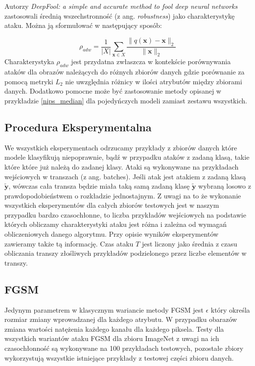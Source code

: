 \documentclass[
    left=2.5cm,         %
    right=2.5cm,        %
    top=2.5cm,          %
    bottom=3cm,         %
    bindingoffset=6mm,  %
    nohyphenation=false %
]{eiti/eiti-thesis}
\renewcommand{\vec}[1]{\mathbf{#1}}
\begin{document}
    Autorzy \textit{DeepFool: a simple and accurate method to fool deep neural networks}\cite{DBLP:journals/corr/Moosavi-Dezfooli15}
    zastosowali średnią wszechstronność (z ang. \textit{robustness}) jako charakterystykę ataku. Można ją sformułować w następujący sposób:

    \begin{equation}
        \rho_{adw}=\frac{1}{|X|}\sum_{\vec{x} \in X} \frac{\|q(\vec{x}) - \vec{x}\|_2}{\|\vec{x}\|_2}
    \end{equation}
    Charakterystyka \(\rho_{adw}\) jest przydatna zwłaszcza w kontekście porównywania ataków dla obrazów należących do
    różnych zbiorów danych gdzie porównanie za pomocą metryki \(L_2\) nie uwzględnia różnicy w ilości atrybutów między zbiorami
    danych.
    Dodatkowo pomocne może być zastosowanie metody opisanej w przykładzie \eqref{nips_median} dla pojedyńczych modeli
    zamiast zestawu wszystkich.

\subsection{Procedura Eksperymentalna}
    We wszystkich eksperymentach odrzucamy przykłady z zbiorów danych które modele klasyfikują niepoprawnie, bądź w
    przypadku ataków z zadaną klasą, takie które które już należą do zadanej klasy. Ataki są wykonywane na przykładach
    wejściowych w transzach (z ang. batches).
Jeśli atak jest atakiem z zadaną klasą $\vec{\widetilde{y}}$, wówczas
    cała transza będzie miała taką samą zadaną klasę $\vec{\widetilde{y}}$ wybraną losowo z prawdopodobieństwem o
    rozkładzie jednostajnym.
Z uwagi na to że wykonanie wszystkich eksperymentów dla całych zbiorów testowych jest w naszym przypadku bardzo czasochłonne,
to liczba przykładów wejściowych na podstawie których obliczamy charakterystyki ataku jest różna i zależna od wymagań obliczeniowych
danego algorytmu. Przy opisie wyników eksperymentów zawieramy także tą informację.
Czas ataku $T$ jest liczony jako średnia z czasu obliczania transzy złośliwych przykładów podzielonego przez liczbe
elementów w transzy.

\subsection{FGSM}\label{FGSM-SCORES}
    Jedynym parametrem w klasycznym wariancie metody FGSM jest \(\epsilon\) który określa rozmiar zmiany wprowadzanej dla
    każdego atrybutu. W przypadku obarazów zmiana wartości natężenia każdego kanału dla każdego piksela. Testy dla wszystkich
    wariantów ataku FGSM dla zbioru ImageNet z uwagi na ich czasochłonność są wykonywane na 100 przykładach testowych,
    pozostałe zbiory wykorzystują wszystkie istniejące przykłady z testowej części zbioru danych.
\end{document}
